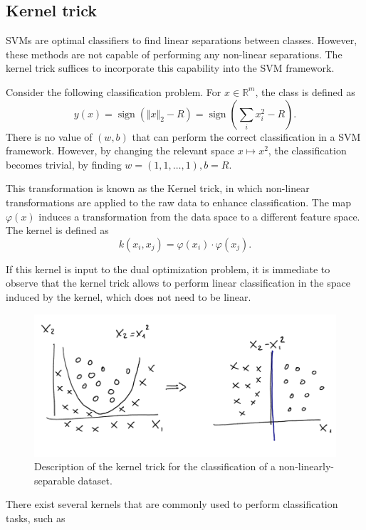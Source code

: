 \documentclass[]{report}
\newcommand{\sign}{\ensuremath{\operatorname{sign}}}
\begin{document}
\subsection{Kernel trick}
SVMs are optimal classifiers to find linear separations between classes. However, these methods are not capable of performing any non-linear separations. The kernel trick suffices to incorporate this capability into the SVM framework.


Consider the following classification problem. For $x \in \mathbb R^m$, the class is defined as
\begin{equation}
y(x) = \sign(\Vert x \Vert_2 - R) = \sign\left( \sum_{i} x_i^2 - R\right). 
\end{equation}
There is no value of $(w, b)$ that can perform the correct classification in a SVM framework. However, by changing the relevant space $x \mapsto x^2$, the classification becomes trivial, by finding $w = (1, 1, \ldots, 1), b = R$. 

This transformation is known as the Kernel trick, in which non-linear transformations are applied to the raw data to enhance classification. The map $\varphi(x)$ induces a transformation from the data space to a different feature space. The kernel is defined as
\begin{equation}
k(x_i, x_j) = \varphi(x_i) \cdot \varphi(x_j).
\end{equation}

If this kernel is input to the dual optimization problem, it is immediate to observe that the kernel trick allows to perform linear classification in the space induced by the kernel, which does not need to be linear. 

\begin{figure}
\centering
\includegraphics[width = .8\linewidth]{images/kernel trick}
\caption{Description of the kernel trick for the classification of a non-linearly-separable dataset. }
\label{fig.kernel_trick}
\end{figure}


There exist several kernels that are commonly used to perform classification tasks, such as
\end{document}
